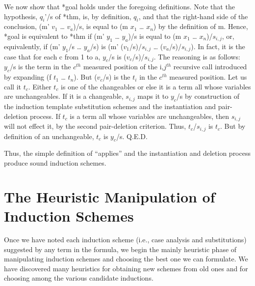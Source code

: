 \documentclass[10pt]{book}
\begin{document}
We now show that *goal holds under the foregoing definitions.
Note that the hypothesis, $q_{i}$'/s of *thm, is, by definition,
$q_{i}$, and that the right-hand side of the conclusion, (m' $v_{1}$ \ldots{} $v_{a}$)/s,
is equal to (m $x_{1}$ \ldots{} $x_{n}$) by the definition of m.
Hence, *goal is equivalent to *thm
if (m' $y_{1}$ \ldots{} $y_{a}$)/s is equal to (m $x_{1}$ \ldots{} $x_{n}$)/$s_{i,j}$,
or, equivalently, if (m' $y_{1}$/s \ldots{} $y_{a}$/s) is
(m' ($v_{1}$/s)/$s_{i,j}$ \ldots{} ($v_{a}$/s)/$s_{i,j}$).  In fact, it is
the case that for each c from 1 to a, $y_{c}$/s is ($v_{c}$/s)/$s_{i,j}$.
The reasoning is as follows:~~$y_{c}$/s is the term in the $c^{th}$ measured
position of the i,$j^{th}$ recursive call introduced by expanding (f $t_{1}$ \ldots{} $t_{n}$).
But ($v_{c}$/s) is the $t_{i}$ in the $c^{th}$ measured position.
Let us call it $t_{c}$.  Either $t_{c}$ is one of the changeables or else it is a
term all whose variables are unchangeables.  If it is a changeable, $s_{i,j}$ maps it to
$y_{c}$/s by construction of the induction template substitution
schemes and the instantiation and pair-deletion process.  If $t_{c}$ is a term
all whose variables are unchangeables, then $s_{i,j}$ will not effect it, by the
second pair-deletion criterion.  Thus, $t_{c}$/$s_{i,j}$ is $t_{c}$.  But
by definition of an unchangeable, $t_{c}$ is $y_{c}$/s.  Q.E.D.

Thus, the simple definition of ``applies'' and the instantiation and deletion
process produce sound induction schemes.

\section{The Heuristic Manipulation of Induction Schemes}
Once we have noted each induction scheme (i.e., case analysis and
substitutions)  suggested
by any term in the formula, we begin the mainly heuristic phase of
manipulating induction schemes and choosing the best one we
can formulate.  We have discovered many heuristics for
obtaining new schemes from old ones  and for choosing among the various
candidate inductions.
\end{document}
